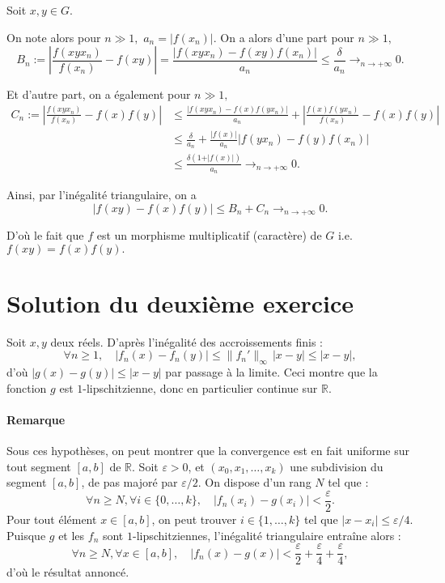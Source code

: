 Soit $x,y\in G.$ 

On note alors pour $n\gg 1,$ $a_{n}=\vert f(x_{n})\vert.$
On a alors d'une part pour $n\gg1,$ $$B_{n}:=\left \vert \frac{f(xyx_{n})}{f(x_{n})}-f(xy) \right\vert =\frac{ \vert f(xyx_{n})-f(xy)f(x_{n}) \vert }{a_{n}}\leq \frac{\delta}{a_{n}}\longrightarrow_{n\rightarrow +\infty} 0.$$

Et d'autre part, on a également pour $n\gg 1,$ 
\begin{align*}
C_{n}:=\left\vert \frac{f(xyx_{n})}{f(x_{n})}-f(x)f(y) \right\vert & \leq \frac{ \vert f(xyx_{n})-f(x)f(yx_{n})\vert }{a_{n}}+ \left\vert \frac{f(x)f(yx_{n})}{f(x_{n})}-f(x)f(y) \right\vert\\
& \leq \frac{\delta}{a_{n}}+ \frac{\vert f(x) \vert }{a_{n}}\vert f(yx_{n})-f(y)f(x_{n})\vert\\
& \leq \frac{\delta(1+\vert f(x) \vert )}{a_{n}}\longrightarrow_{n\rightarrow +\infty} 0.
\end{align*}

Ainsi, par l'inégalité triangulaire, on a $$\vert f(xy)-f(x)f(y)\vert \leq B_{n}+C_{n}\longrightarrow_{n\rightarrow +\infty}0.$$

D'où le fait que $f$ est un morphisme multiplicatif (caractère) de $G$ i.e. $\displaystyle f(xy)=f(x)f(y).$

\section{Solution du deuxième exercice} %

Soit $x,y$ deux réels. D'après l'inégalité des accroissements finis :
\[
\forall n \geqslant 1,\quad |f_n(x) - f_n(y)| \leqslant \|f_n'\|_\infty\,|x-y| \leqslant |x-y|,
\]
d'où $|g(x) - g(y)| \leqslant |x-y|$ par passage à la limite. Ceci montre que la fonction $g$ est $1$-lipschitzienne, donc en particulier continue sur $\mathbb R$.

\paragraph{Remarque} Sous ces hypothèses, on peut montrer que la convergence est en fait uniforme sur tout segment $[a,b]$ de $\mathbb R$. Soit $\varepsilon > 0$, et $(x_0,x_1,\dots,x_k)$ une subdivision du segment $[a,b]$, de pas majoré par $\varepsilon/2$. On dispose d'un rang $N$ tel que :
\[
\forall n\geqslant N,\forall i \in \{0,\dots,k\},\quad |f_n(x_i) - g(x_i)| < \frac{\varepsilon}2.
\]
Pour tout élément $x \in [a,b]$, on peut trouver $i \in \{1,\dots,k\}$ tel que $|x-x_i|\leqslant \varepsilon/4$. Puisque $g$ et les $f_n$ sont $1$-lipschitziennes, l'inégalité triangulaire entraîne alors :
\[
\forall n \geqslant N,\forall x \in [a,b],\quad |f_n(x) - g(x)| < \frac{\varepsilon}2 + \frac{\varepsilon}4 + \frac{\varepsilon}4,
\]
d'où le résultat annoncé.

